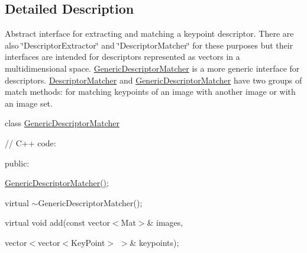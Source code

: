 \subsection{Detailed Description}
Abstract interface for extracting and matching a keypoint descriptor. There are also \char`\"{}\+Descriptor\+Extractor\char`\"{} and \char`\"{}\+Descriptor\+Matcher\char`\"{} for these purposes but their interfaces are intended for descriptors represented as vectors in a multidimensional space. {\ttfamily \mbox{\hyperlink{classorg_1_1opencv_1_1features2d_1_1_generic_descriptor_matcher}{Generic\+Descriptor\+Matcher}}} is a more generic interface for descriptors. {\ttfamily \mbox{\hyperlink{classorg_1_1opencv_1_1features2d_1_1_descriptor_matcher}{Descriptor\+Matcher}}} and {\ttfamily \mbox{\hyperlink{classorg_1_1opencv_1_1features2d_1_1_generic_descriptor_matcher}{Generic\+Descriptor\+Matcher}}} have two groups of match methods\+: for matching keypoints of an image with another image or with an image set.

class \mbox{\hyperlink{classorg_1_1opencv_1_1features2d_1_1_generic_descriptor_matcher}{Generic\+Descriptor\+Matcher}} {\ttfamily }

{\ttfamily }

{\ttfamily }

{\ttfamily // C++ code\+:}

{\ttfamily }

{\ttfamily }

{\ttfamily public\+:}

{\ttfamily }

{\ttfamily }

{\ttfamily \mbox{\hyperlink{classorg_1_1opencv_1_1features2d_1_1_generic_descriptor_matcher_a0a76a002983674ac66ea7419b901231c}{Generic\+Descriptor\+Matcher()}};}

{\ttfamily }

{\ttfamily }

{\ttfamily virtual $\sim$\+Generic\+Descriptor\+Matcher();}

{\ttfamily }

{\ttfamily }

{\ttfamily virtual void add(const vector$<$\+Mat$>$\& images,}

{\ttfamily }

{\ttfamily }

{\ttfamily vector$<$vector$<$\+Key\+Point$>$ $>$\& keypoints);}

{\ttfamily }

{\ttfamily }

